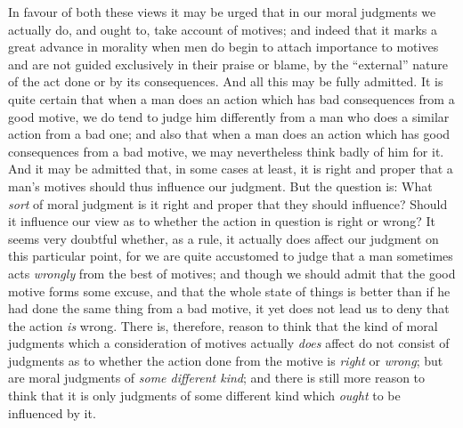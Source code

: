 In favour of both these views it may be urged that in our moral
judgments we actually do, and ought to, take account of motives; and
indeed that it marks a great advance in morality when men do begin to
attach importance to motives and are not guided exclusively in their
praise or blame, by the ``external'' nature of the act done or by its
consequences. And all this may be fully admitted. It is quite certain
that when a  man does an action which has bad consequences
from a good motive, we do tend to judge him differently from a man who
does a similar action from a bad one; and also that when a man does an
action which has good consequences from a bad motive, we may
nevertheless think badly of him for it. And it may be admitted that,
in some cases at least, it is right and proper that a man's motives
should thus influence our judgment. But the question is: What
\textit{sort} of moral judgment is it right and proper that they
should influence? Should it influence our view as to whether the
action in question is right or wrong? It seems very doubtful whether,
as a rule, it actually does affect our judgment on this particular
point, for we are quite accustomed to judge that a man sometimes acts
\textit{wrongly} from the best of motives; and though we should admit
that the good motive forms some excuse, and that the whole state of
things is better than if he had done the same thing from a bad motive,
it yet does not lead us to deny that the action \textit{is} wrong.
There is, therefore, reason to think that the kind of moral judgments
which a consideration of  motives actually \textit{does}
affect do not consist of judgments as to whether the action done from
the motive is \textit{right} or \textit{wrong}; but are moral
judgments of \textit{some different kind}; and there is still more
reason to think that it is only judgments of some different kind which
\textit{ought} to be influenced by it.

